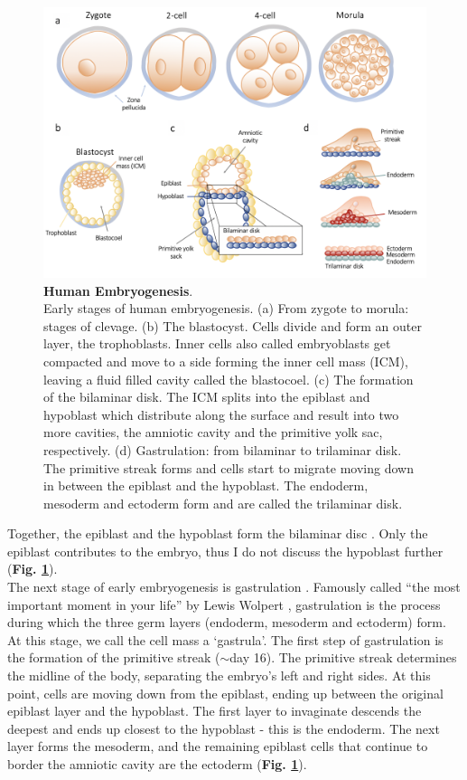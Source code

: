 \begin{figure}[h]
\centering
\includegraphics[width=14.5cm]{Chapter1/Fig/embryogenesis_til_gastrulation.png}
\caption[Human Embryogenesis]{\textbf{Human Embryogenesis}.\\
Early stages of human embryogenesis.
(a) From zygote to morula: stages of clevage.
(b) The blastocyst.
Cells divide and form an outer layer, the trophoblasts.
Inner cells also called embryoblasts get compacted and move to a side forming the inner cell mass (ICM), leaving a fluid filled cavity called the blastocoel.
(c) The formation of the bilaminar disk.
The ICM splits into the epiblast and hypoblast which distribute along the surface and result into two more cavities, the amniotic cavity and the primitive yolk sac, respectively.
(d) Gastrulation: from bilaminar to trilaminar disk.
The primitive streak forms and cells start to migrate moving down in between the epiblast and the hypoblast.
The endoderm, mesoderm and ectoderm form and are called the trilaminar disk.}
\label{fig:embryogenesis}
\end{figure}

Together, the epiblast and the hypoblast form the bilaminar disc \cite{hertig1956description}.
Only the epiblast contributes to the embryo, thus I do not discuss the hypoblast further (\textbf{Fig. \ref{fig:embryogenesis}}).\\

The next stage of early embryogenesis is gastrulation \cite{sheng2015epiblast}.
Famously called “the most important moment in your life” by Lewis Wolpert \cite{wolpert2015interview}, gastrulation is the process during which the three germ layers (endoderm, mesoderm and ectoderm) form.
At this stage, we call the cell mass a `gastrula'.
The first step of gastrulation is the formation of the primitive streak ($\sim$day 16).
The primitive streak determines the midline of the body, separating the embryo's left and right sides.
At this point, cells are moving down from the epiblast, ending up between the original epiblast layer and the hypoblast.
The first layer to invaginate descends the deepest and ends up closest to the hypoblast - this is the endoderm.
The next layer forms the mesoderm, and the remaining epiblast cells that continue to border the amniotic cavity are the ectoderm (\textbf{Fig. \ref{fig:embryogenesis}}).\\

